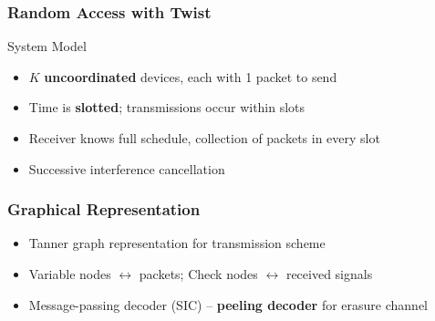 \documentclass[10pt]{beamer}
\begin{document}
\begin{frame}
\frametitle{Random Access with Twist}
\begin{center}

\end{center}
\begin{block}{System Model}
  \begin{itemize}
  \item $K$ \textbf{uncoordinated} devices, each with 1 packet to send
  \item Time is \textbf{slotted}; transmissions occur within slots
  \item Receiver knows full schedule, collection of packets in every slot
  \item Successive interference cancellation
  \end{itemize}
\end{block}
\end{frame}


\begin{frame}
\frametitle{Graphical Representation}
\begin{itemize}
\item Tanner graph representation for transmission scheme
\item Variable nodes $\leftrightarrow$ packets;
Check nodes $\leftrightarrow$ received signals
\item Message-passing decoder (SIC) -- \textbf{peeling decoder} for erasure channel
\end{itemize}
\begin{columns}
  \begin{center}
  \scalebox{0.8}{}
  \end{center}
  \begin{center}
  \scalebox{0.8}{}
  \end{center}
\end{columns}
\end{frame}
\end{document}
